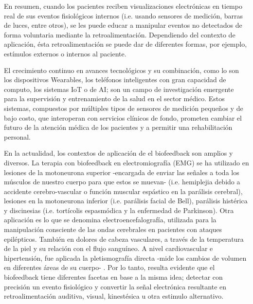 \noindent{}
\newline\newline
En resumen, cuando los pacientes reciben visualizaciones electrónicas en tiempo real de sus eventos fisiológicos internos (i.e. usando sensores de medición, barras de luces, entre otros), se les puede educar a manipular eventos no detectados de forma voluntaria mediante la retroalimentación. Dependiendo del contexto de aplicación, ésta retroalimentación se puede dar de diferentes formas, por ejemplo, estímulos externos o internos al paciente.

El crecimiento continuo en avances tecnológicos y su combinación, como lo son los dispositivos \gls{Wearables}, los teléfonos inteligentes con gran capacidad de computo, los sistemas IoT o de AI; son un campo de investigación emergente para la supervisión y entrenamiento de la salud en el sector médico. Estos sistemas, compuestos por múltiples tipos de sensores de medición pequeños y de bajo costo, que interoperan con servicios clínicos de fondo, prometen cambiar el futuro de la atención médica de los pacientes y a permitir una rehabilitación personal. 

En la actualidad, los contextos de aplicación de el biofeedback son amplios y diversos. La terapia con biofeedback en electromiografía (EMG) se ha utilizado en lesiones de la motoneurona superior -encargada de enviar las señales a toda los músculos de nuestro cuerpo para que estos se muevan- (i.e. hemiplejia debido a accidente cerebro-vascular o función muscular espástico en la parálisis cerebral), lesiones en la motoneurona inferior (i.e. parálisis facial de Bell), parálisis histérica y discinesias (i.e. tortícolis espasmódica y la enfermedad de Parkinson). Otra aplicación es lo que se denomina electroencefalografía, utilizada para la manipulación consciente de las ondas cerebrales en pacientes con ataques epilépticos. También en dolores de cabeza vasculares, a través de la temperatura de la piel y su relación con el flujo sanguíneo. A nivel cardiovascular e hipertensión, fue aplicada la pletismografía directa -mide los cambios de volumen en diferentes áreas de su cuerpo- \cite{Basmajian197738}. Por lo tanto, resulta evidente que el biofeedback tiene diferentes facetas en base a la misma idea; detectar con precisión un evento fisiológico y convertir la señal electrónica resultante en retroalimentación auditiva, visual, kinestésica u otra estimulo alternativo.

